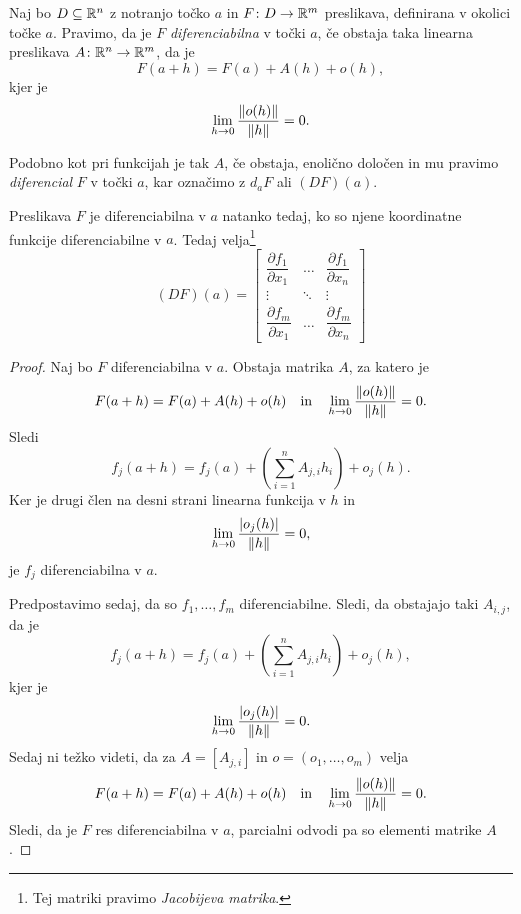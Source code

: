\begin{okvir}
\begin{definicija}
Naj bo $D \subseteq \mathbb{R}^n$ z notranjo točko $a$ in
$F \colon D \to \mathbb{R}^m$ preslikava, definirana v okolici točke $a$.
Pravimo, da je $F$
\emph{diferenciabilna} v točki
$a$, če obstaja taka linearna preslikava $A \colon \mathbb{R}^n \to \mathbb{R}^m$,
da je
\[
F(a+h) = F(a) + A(h) + o(h),
\]
kjer je
\[
\lim_{h \to 0} \frac{\left\lVert o(h)\right\rVert}{\left\lVert h\right\rVert} = 0.
\]
\end{definicija}
\end{okvir}

\begin{opomba}
Podobno kot pri funkcijah je tak $A$, če obstaja, enolično določen
in mu pravimo \emph{diferencial} $F$ v točki $a$, kar označimo z
$d_aF$ ali $(DF)(a)$.
\end{opomba}

\begin{izrek}
Preslikava $F$ je diferenciabilna v $a$ natanko tedaj, ko so njene
koordinatne funkcije diferenciabilne v $a$. Tedaj velja\footnote{
Tej matriki pravimo \emph{Jacobijeva matrika}.}
\[
(DF)(a) =
\begin{bmatrix}
\dfrac{\partial f_1}{\partial x_1} &
\dots                              &
\dfrac{\partial f_1}{\partial x_n} \\ 
\vdots                             &
\ddots                             &
\vdots                             \\ 
\dfrac{\partial f_m}{\partial x_1} &
\dots                              &
\dfrac{\partial f_m}{\partial x_n}
\end{bmatrix}
\]
\end{izrek}

\begin{proof}
Naj bo $F$ diferenciabilna v $a$. Obstaja matrika $A$, za katero je
\[
F(a+h) = F(a) + A(h) + o(h)
\quad \text{in} \quad
\lim_{h \to 0} \frac{\left\lVert o(h)\right\rVert}{\left\lVert h\right\rVert} = 0.
\]
Sledi
\[
f_j(a+h) = f_j(a) + \left(\sum_{i=1}^n A_{j,i} h_i\right) + o_j(h).
\]
Ker je drugi člen na desni strani linearna funkcija v $h$ in
\[
\lim_{h \to 0} \frac{\left\lvert o_j(h)\right\rvert}{\left\lVert h\right\rVert} = 0,
\]
je $f_j$ diferenciabilna v $a$.

Predpostavimo sedaj, da so $f_1, \dots, f_m$ diferenciabilne.
Sledi, da obstajajo taki $A_{i,j}$, da je
\[
f_j(a+h) = f_j(a) + \left(\sum_{i=1}^n A_{j,i} h_i\right) + o_j(h),
\]
kjer je
\[
\lim_{h \to 0} \frac{\left\lvert o_j(h)\right\rvert}{\left\lVert h\right\rVert} = 0.
\]
Sedaj ni težko videti, da za $A = [A_{j,i}]$ in
$o = (o_1, \dots, o_m)$ velja
\[
F(a+h) = F(a) + A(h) + o(h)
\quad \text{in} \quad
\lim_{h \to 0} \frac{\left\lVert o(h)\right\rVert}{\left\lVert h\right\rVert} = 0.
\]
Sledi, da je $F$ res diferenciabilna v $a$, parcialni odvodi pa so
elementi matrike $A$.
\end{proof}

